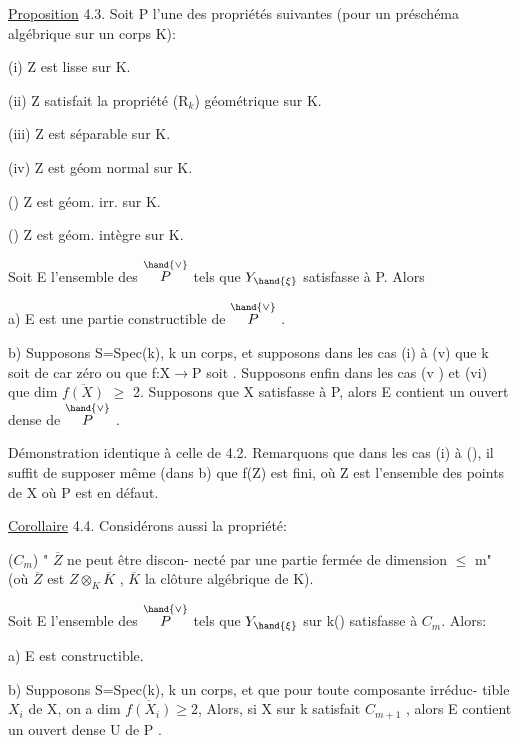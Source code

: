
\uline{Proposition} 4.3.    Soit P l'une des propriétés  suivantes (pour un
préschéma algébrique sur un corps K):

(i)  Z  est lisse sur K.

(ii)  Z satisfait la propriété (R$_k$) géométrique sur K.

(iii)  Z est séparable sur K.

(iv)  Z est géom normal sur K.

()  Z  est géom. irr.  sur K.

()  Z est géom. intègre  sur K.

Soit E l'ensemble des \hand{$\xi \in$} $\overset{\hand{\vee}}{P}$  tels que $Y_{\hand{\xi}}$ satisfasse à P. Alors

a)  E est une partie constructible de $\overset{\hand{\vee}}{P}$ .

b)  Supposons  S=Spec(k), k un corps, et supposons dans les cas (i) à (v) que k soit de
car zéro  ou que f:X$\rightarrow$P  soit . Supposons enfin dans les
cas (v ) et (vi)  que dim $\overline{f(X)}$ $\geqslant$ 2.  Supposons que X satisfasse à P,
alors E contient un ouvert  dense de $\overset{\hand{\vee}}{P}$ .

Démonstration identique à celle de 4.2.   Remarquons que dans
les cas (i) à (), il suffit de supposer même (dans b) que  f(Z) est
fini, où Z est l'ensemble des points de X où  P est en défaut.

\uline{Corollaire} 4.4.    Considérons aussi la propriété:

($C_m$)   " $\overline{Z}$ ne peut être discon-%
necté par une partie fermée de dimension  $\leqslant$ m" (où $\overline{Z}$ est $Z\otimes_K\overline{K}$ , $\overline{K}$
la clôture  algébrique de K).

Soit E l'ensemble des \hand{$\xi \in$} $\overset{\hand{\vee}}{P}$  tels que  $Y_{\hand{\xi}}$ sur k(\hand{$\xi$}) satisfasse à $C_m$.
Alors:

a)  E est constructible.

b)   Supposons S=Spec(k), k un corps, et que  pour toute composante irréduc-%
tible  $X_i$ de X, on a dim $\overline{f(X_i)} \geqslant 2$, Alors, si X sur k satisfait $C_{m+1}$ ,
alors E\hand{$_{\unsure{\xi}}$} contient un ouvert dense U de P .


